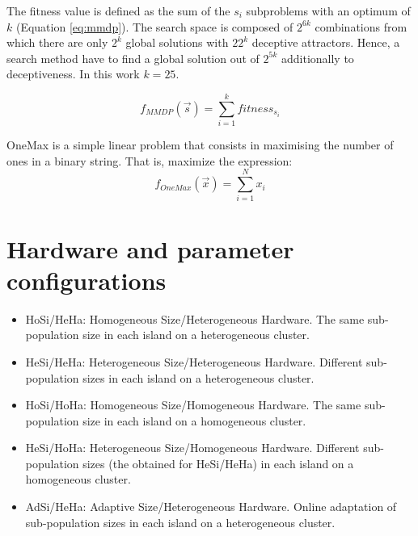 The fitness value is defined as the sum of the $s_i$ subproblems with an optimum of $k$ (Equation \ref{eq:mmdp}).
The search space is composed of $2^{6k}$ combinations from which there
are only $2^k$ global solutions with $22^k$ deceptive
attractors. Hence, a search method have to find a global solution
out of $2^{5k}$ additionally to deceptiveness. In this work $k=25$. 

\begin{equation}\label{eq:mmdp}
f_{MMDP}(\vec s)= \sum_{i=1}^{k} fitness_{s_i}
\end{equation}

OneMax is a simple linear problem  %
that consists in maximising the number of ones in a binary string. That is, maximize the expression:
\begin{equation}
f_{OneMax}(\vec{x}) = \sum_{i=1}^{N}{x_{i}}
\end{equation}

\section{Hardware and parameter configurations}


\begin{itemize}
\item HoSi/HeHa: Homogeneous Size/Heterogeneous Hardware. The same sub-population size in each island on a heterogeneous cluster.
\item HeSi/HeHa: Heterogeneous Size/Heterogeneous Hardware. Different sub-population sizes in each island on a heterogeneous cluster.
\item HoSi/HoHa: Homogeneous Size/Homogeneous Hardware. The same sub-population size in each island on a homogeneous cluster.
\item HeSi/HoHa: Heterogeneous Size/Homogeneous Hardware. Different sub-population sizes (the obtained for HeSi/HeHa) in each island on a homogeneous cluster.

\item AdSi/HeHa: Adaptive Size/Heterogeneous Hardware. Online adaptation of sub-population sizes in each island on a heterogeneous cluster.
\end{itemize} %

